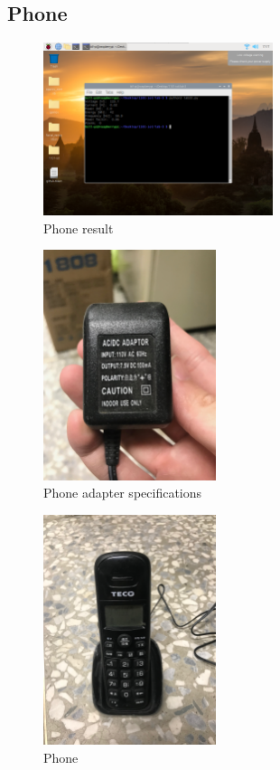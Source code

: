 \documentclass[12pt, a4paper, onside]{article}
\begin{document}
\subsection{Phone}
\begin{figure}[h]
  \centering
  \includegraphics[width=0.6\textwidth]{img/10_res_phone}
  \caption{Phone result}
\end{figure}
\begin{figure}[h]
  \centering
  \includegraphics[angle=-90, origin=c, width=0.45\textwidth]{img/10_spe_phone_adapter}
  \caption{Phone adapter specifications}
\end{figure}
\begin{figure}[h]
  \centering
  \includegraphics[angle=-90, origin=c, width=0.45\textwidth]{img/10_pic_phone}
  \caption{Phone}
\end{figure}
\end{document}
